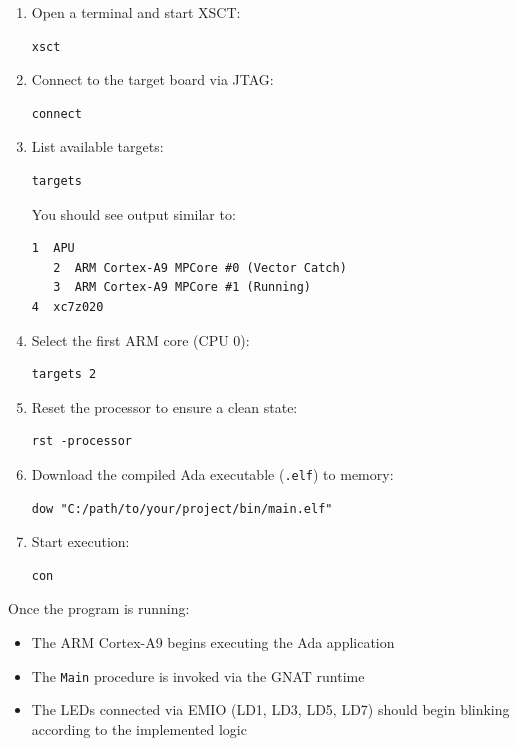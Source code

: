 \begin{enumerate}
    \item Open a terminal and start XSCT:
\begin{lstlisting}[style=xdc]
xsct
\end{lstlisting}

    \item Connect to the target board via JTAG:
\begin{lstlisting}[style=xdc]
connect
\end{lstlisting}

    \item List available targets:
\begin{lstlisting}[style=xdc]
targets
\end{lstlisting}

    You should see output similar to:
\begin{lstlisting}
1  APU
   2  ARM Cortex-A9 MPCore #0 (Vector Catch)
   3  ARM Cortex-A9 MPCore #1 (Running)
4  xc7z020
\end{lstlisting}

    \item Select the first ARM core (CPU 0):
\begin{lstlisting}[style=xdc]
targets 2
\end{lstlisting}

    \item Reset the processor to ensure a clean state:
\begin{lstlisting}[style=xdc]
rst -processor
\end{lstlisting}

    \item Download the compiled Ada executable (\texttt{.elf}) to memory:
\begin{lstlisting}[style=xdc]
dow "C:/path/to/your/project/bin/main.elf"
\end{lstlisting}

    \item Start execution:
\begin{lstlisting}[style=xdc]
con
\end{lstlisting}
\end{enumerate}

Once the program is running:
\begin{itemize}
    \item The ARM Cortex-A9 begins executing the Ada application
    \item The \texttt{Main} procedure is invoked via the GNAT runtime
    \item The LEDs connected via EMIO (LD1, LD3, LD5, LD7) should begin blinking according to the implemented logic
\end{itemize}



